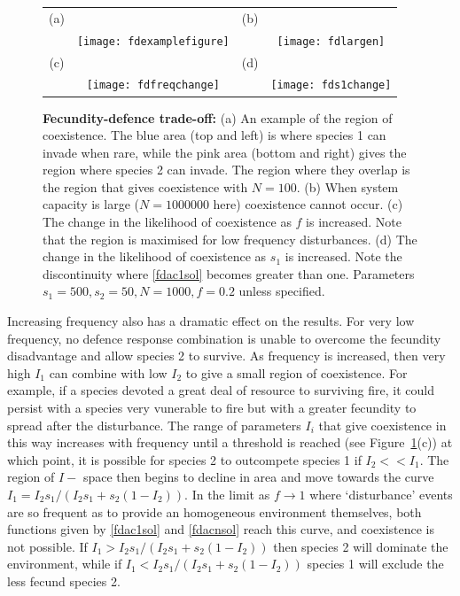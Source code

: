 \documentclass[preprint,10pt,reqno]{amsart}
\begin{document}
\begin{figure}[htbp]
\begin{tabular}{cccc}
(a)&&(b)&\\
&\texttt{[image: fdexamplefigure]}&&\texttt{[image: fdlargen]} \\
(c)&&(d)&\\
&\texttt{[image: fdfreqchange]}&&\texttt{[image: fds1change]}
\end{tabular}
\caption{\textbf{Fecundity-defence trade-off:} (a) An example of the region of coexistence. The blue area (top and left) is where species 1 can invade when rare, while the pink area (bottom and right) gives the region where species 2 can invade. The region where they overlap is the region that gives coexistence with $N=100$. (b)  When system capacity is large ($N=1 000 000$ here) coexistence cannot occur. (c) The change in the likelihood of coexistence as $f$ is increased. Note that the region is maximised for low frequency disturbances. (d) The change in the likelihood of coexistence as $s_1$ is increased. Note the discontinuity where \eqref{fdac1sol} becomes greater than one.  Parameters $s_1=500,s_2=50,N=1000,f=0.2$ unless specified.}
\label{fd}
\end{figure}

Increasing frequency also has a dramatic effect on the results. For very low frequency, no defence response combination is unable to overcome the fecundity disadvantage and allow species 2 to survive. As frequency is increased, then very high $I_1$ can combine with low $I_2$ to give a small region of coexistence. For example, if a species devoted a great deal of resource to surviving fire, it could persist with a species very vunerable to fire but with a greater fecundity to spread after the disturbance. The range of parameters $I_i$ that give coexistence in this way increases with frequency until a threshold is reached (see Figure~\ref{fd}(c)) at which point, it is possible for species 2 to outcompete species 1 if $I_2<<I_1$. The region of $I-$ space then begins to decline in area and move towards the curve $I_1=I_2s_1/(I_2s_1+s_2(1-I_2))$. In the limit as $f \to 1$ where `disturbance' events are so frequent as to provide an homogeneous environment themselves, both functions given by \eqref{fdac1sol} and \eqref{fdacnsol} reach this curve, and coexistence is not possible. If $I_1>I_2s_1/(I_2s_1+s_2(1-I_2))$ then species 2 will dominate the environment, while if $I_1<I_2s_1/(I_2s_1+s_2(1-I_2))$ species 1 will exclude the less fecund species 2.
\end{document}
